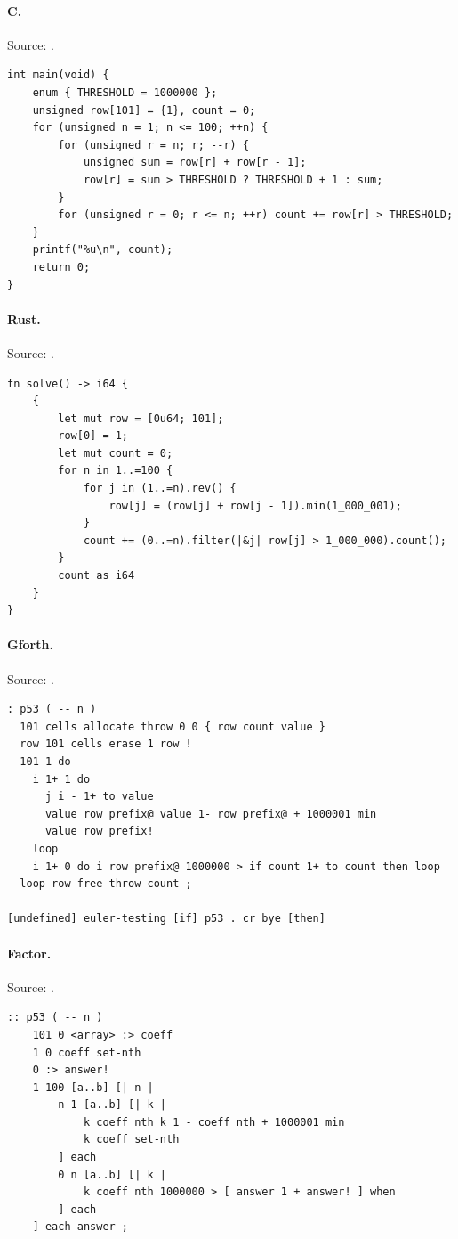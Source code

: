 \paragraph{C.} Source: .
\begin{lstlisting}
int main(void) {
    enum { THRESHOLD = 1000000 };
    unsigned row[101] = {1}, count = 0;
    for (unsigned n = 1; n <= 100; ++n) {
        for (unsigned r = n; r; --r) {
            unsigned sum = row[r] + row[r - 1];
            row[r] = sum > THRESHOLD ? THRESHOLD + 1 : sum;
        }
        for (unsigned r = 0; r <= n; ++r) count += row[r] > THRESHOLD;
    }
    printf("%u\n", count);
    return 0;
}
\end{lstlisting}

\paragraph{Rust.} Source: .
\begin{lstlisting}
fn solve() -> i64 {
    {
        let mut row = [0u64; 101];
        row[0] = 1;
        let mut count = 0;
        for n in 1..=100 {
            for j in (1..=n).rev() {
                row[j] = (row[j] + row[j - 1]).min(1_000_001);
            }
            count += (0..=n).filter(|&j| row[j] > 1_000_000).count();
        }
        count as i64
    }
}
\end{lstlisting}

\paragraph{Gforth.} Source: .
\begin{lstlisting}
: p53 ( -- n )
  101 cells allocate throw 0 0 { row count value }
  row 101 cells erase 1 row !
  101 1 do
    i 1+ 1 do
      j i - 1+ to value
      value row prefix@ value 1- row prefix@ + 1000001 min
      value row prefix!
    loop
    i 1+ 0 do i row prefix@ 1000000 > if count 1+ to count then loop
  loop row free throw count ;

[undefined] euler-testing [if] p53 . cr bye [then]
\end{lstlisting}

\paragraph{Factor.} Source: .
\begin{lstlisting}
:: p53 ( -- n )
    101 0 <array> :> coeff
    1 0 coeff set-nth
    0 :> answer!
    1 100 [a..b] [| n |
        n 1 [a..b] [| k |
            k coeff nth k 1 - coeff nth + 1000001 min
            k coeff set-nth
        ] each
        0 n [a..b] [| k |
            k coeff nth 1000000 > [ answer 1 + answer! ] when
        ] each
    ] each answer ;
\end{lstlisting}

